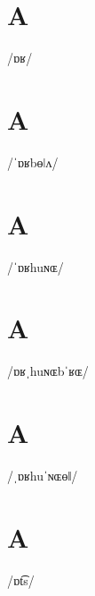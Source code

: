 \documentclass[10pt,a4paper,twoside]{book}
\begin{document}
\section*{A}

\begin{multicols}{3}
 {/ɒʁ/} {}
\end{multicols}

\section*{A}

\begin{multicols}{3}
 {/ˈɒʁbɵǀʌ/} {}
\end{multicols}

\section*{A}

\begin{multicols}{3}
 {/ˈɒʁhuɴɶ/} {}
\end{multicols}

\section*{A}

\begin{multicols}{3}
 {/ɒʁˌhuɴɶbˈʁɶ/} {}
\end{multicols}

\section*{A}

\begin{multicols}{3}
 {/ˌɒʁhuˈɴɶɵǁ/} {}
\end{multicols}

\section*{A}

\begin{multicols}{3}
 {/ɒt͡s/} {}
\end{multicols}
\end{document}
